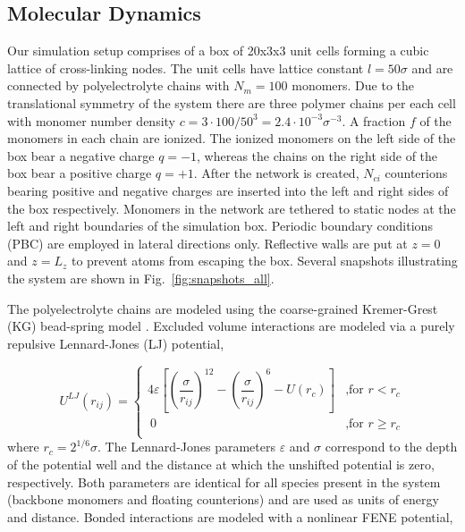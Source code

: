 \documentclass[twoside,twocolumn,9pt]{article}
\begin{document}
\subsection{Molecular Dynamics}
Our simulation setup comprises of a box of 20x3x3 unit cells forming a cubic lattice of cross-linking nodes. The unit cells have lattice constant $l = 50\sigma$ and are connected by polyelectrolyte chains with $N_m = 100$ monomers. Due to the translational symmetry of the system there are three polymer chains per each cell with monomer number density $c = 3 \cdot 100 / 50^3 = 2.4 \cdot 10^{-3}\sigma^{-3}$. A fraction $f$ of the monomers in each chain are ionized. The ionized monomers on the left side of the box bear a negative charge $q= -1$, whereas the chains on the right side of the box bear a positive charge $q= +1$.  After the network is created, $N_{ci}$ counterions bearing positive and negative charges are inserted into the left and right sides of the box respectively. Monomers in the network are tethered to static nodes at the left and right boundaries of the simulation box. Periodic boundary conditions (PBC) are employed in lateral directions only. Reflective walls are put at $z=0$ and $z=L_z$ to prevent atoms from escaping the box. Several snapshots illustrating the system are shown in Fig.~\ref{fig:snapshots_all}.

The polyelectrolyte chains are modeled using the coarse-grained Kremer-Grest (KG) bead-spring model \cite{Kremer_1990}. Excluded volume interactions are modeled via a purely repulsive Lennard-Jones (LJ) potential, 

\begin{equation}\label{eq:lj_explain}
  U^{LJ}(r_{ij}) =
  \begin{cases}
    4 \varepsilon\left[\left( \dfrac{\sigma}{r_{ij}}\right)^{12} - \left(\dfrac{\sigma}{r_{ij}}\right)^{6}- U(r_c) \right] & \text{,for $r<r_c$} \\
    \ 0 & \text{,for $r \geq r_c$} \\
  \end{cases}
\end{equation}
where $r_c = 2^{1/6}\sigma$. The Lennard-Jones parameters $\varepsilon$ and $\sigma$ correspond to the depth of the potential well and the distance at which the unshifted potential is zero, respectively. Both parameters are identical for all species present in the system (backbone monomers and floating counterions) and are used as units of energy and distance. Bonded interactions are modeled with a nonlinear FENE potential,
\end{document}
